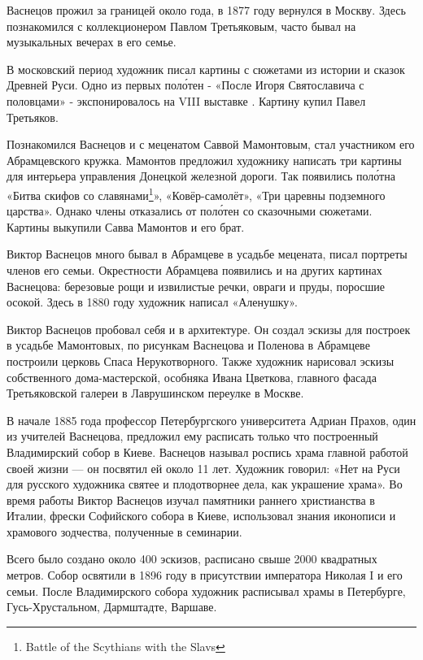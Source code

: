 Васнецов прожил за границей около года, в 1877 году вернулся в Москву. Здесь познакомился с коллекционером Павлом Третьяковым, часто бывал на музыкальных вечерах в его семье.

В московский период художник писал картины с сюжетами из истории и сказок Древней Руси. Одно из первых пол\'{о}тен - «После  Игоря Святославича с половцами» -  экспонировалось на VIII выставке . Картину купил Павел Третьяков.

Познакомился Васнецов и с меценатом Саввой Мамонтовым, стал участником его Абрамцевского кружка. Мамонтов предложил художнику написать три картины для интерьера управления Донецкой железной дороги. Так появились пол\'{о}тна «Битва скифов со славянами\footnote{Battle of the Scythians with the Slavs}», «Ковёр-самолёт», «Три царевны подземного царства». Однако члены  отказались от пол\'{о}тен со сказочными сюжетами. Картины выкупили Савва Мамонтов и его брат.

Виктор Васнецов много бывал в Абрамцеве в усадьбе мецената, писал портреты членов его семьи. Окрестности Абрамцева появились и на других картинах Васнецова: березовые рощи и извилистые речки, овраги и пруды, поросшие осокой. Здесь в 1880 году художник написал «Аленушку».

Виктор Васнецов пробовал себя и в архитектуре. Он создал эскизы для построек в усадьбе Мамонтовых, по рисункам Васнецова и Поленова в Абрамцеве построили церковь Спаса Нерукотворного. Также художник нарисовал эскизы собственного дома-мастерской, особняка Ивана Цветкова, главного фасада Третьяковской галереи в Лаврушинском переулке в Москве.

В начале 1885 года профессор Петербургского университета Адриан Прахов, один из учителей Васнецова, предложил ему расписать только что построенный Владимирский собор в Киеве. Васнецов называл роспись храма главной работой своей жизни — он посвятил ей около 11 лет. Художник говорил: «Нет на Руси для русского художника святее и плодотворнее дела, как украшение храма». Во время работы Виктор Васнецов изучал памятники раннего христианства в Италии, фрески Софийского собора в Киеве, использовал знания иконописи и храмового зодчества, полученные в семинарии.

Всего было создано около 400 эскизов, расписано свыше 2000 квадратных метров. Собор освятили в 1896 году в присутствии императора Николая I и его семьи. После Владимирского собора художник расписывал храмы в Петербурге, Гусь-Хрустальном, Дармштадте, Варшаве.

